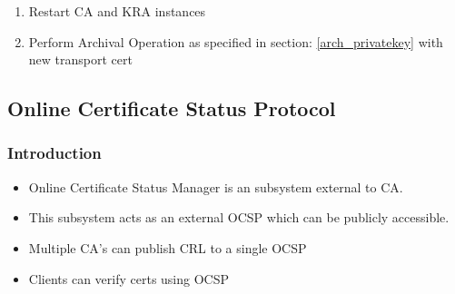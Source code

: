 \documentclass[a4paper]{article}
\begin{document}
\begin{enumerate}[label*=\arabic*.]
\begin{enumerate}[label*=\arabic*.]
\begin{enumerate}[label*=\arabic*.]
\begin{enumerate}[label*=\arabic*.]
                                \item Restart CA and KRA instances
                                \item Perform Archival Operation as specified in section: \ref{arch_privatekey} with new transport cert
                            \end{enumerate}
                    \end{enumerate}
            \end{enumerate}
    \end{enumerate}
\subsection{Online Certificate Status Protocol}
\subsubsection{Introduction}
    \begin{itemize}
        \item Online Certificate Status Manager is an subsystem external to CA.
        \item This subsystem acts as an external OCSP which can be publicly accessible.
        \item Multiple CA's can publish CRL to a single OCSP 
        \item Clients can verify certs using OCSP 
    \end{itemize}
\end{document}
